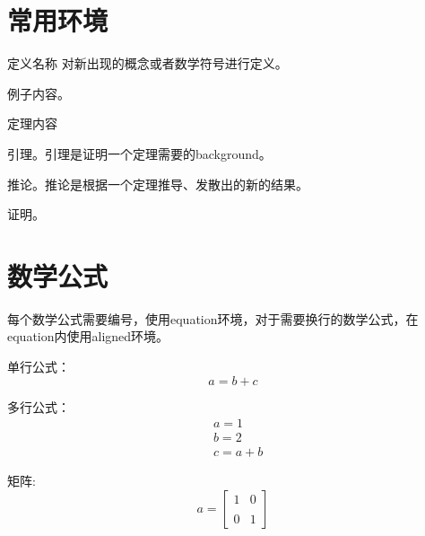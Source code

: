 \documentclass[a4paper,9pt]{extarticle}
\begin{document}
\begin{multicols*}{2}
\section{常用环境}

\begin{mydef}{定义名称}
    对新出现的概念或者数学符号进行定义。
\end{mydef}

\begin{example}
    例子内容。
\end{example}

\begin{theorem}
    定理内容
\end{theorem}

\begin{lemma}
    引理。引理是证明一个定理需要的background。
\end{lemma}

\begin{corollary}
    推论。推论是根据一个定理推导、发散出的新的结果。
\end{corollary}

\begin{pr}
    证明。
\end{pr}


\section{数学公式}

    每个数学公式需要编号，使用equation环境，对于需要换行的数学公式，在equation内使用aligned环境。
    
    单行公式：
    \begin{equation}
        a = b + c
    \end{equation}
    
    多行公式：
    \begin{equation}
        \begin{aligned}
        & a = 1 \\
        & b = 2 \\
        & c = a + b
        \end{aligned}
    \end{equation}
    
    矩阵:
    \begin{equation}
        a = \begin{bmatrix} 
            1 & 0 \\\\
            0 & 1 
            \end{bmatrix}
    \end{equation}

\end{multicols*}
\end{document}
